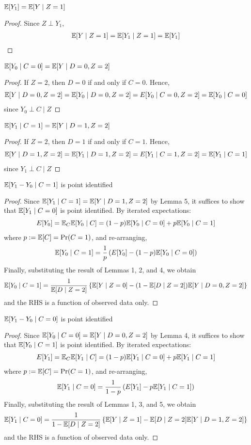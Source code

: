\begin{lem}
$\mathbb{E}[Y_1] = \mathbb{E}[Y\;|\;Z=1]$
\end{lem}
\begin{proof}
Since $Z\perp Y_1$, 
\begin{align*}
\mathbb{E}[Y\;|\;Z=1] =\mathbb{E}[Y_1\;|\;Z=1] = \mathbb{E}[Y_1]
\end{align*}
\end{proof}


\begin{lem}
$\mathbb{E}[Y_0\;|\;C=0] = \mathbb{E}[Y\;|\; D=0,Z=2]$
\end{lem}
\begin{proof}
If $Z=2$, then $D=0$ if and only if $C=0$. Hence,
\[\mathbb{E}[Y\;|\;D=0, Z=2] = \mathbb{E}[Y_0\;|\;D=0, Z=2] = E[Y_0\;|\;C=0, Z=2]=\mathbb{E}[Y_0\;|\;C=0]\]
since $Y_0\perp C\;|\;Z$
\end{proof}

\begin{lem}
$\mathbb{E}[Y_1\;|\;C=1] = \mathbb{E}[Y\;|\; D=1,Z=2]$
\end{lem}
\begin{proof}
If $Z=2$, then $D=1$ if and only if $C=1$. Hence,
\[\mathbb{E}[Y\;|\;D=1, Z=2] = \mathbb{E}[Y_1\;|\;D=1, Z=2] = E[Y_1\;|\;C=1, Z=2]=\mathbb{E}[Y_1\;|\;C=1]\]
since $Y_1\perp C\;|\;Z$
\end{proof}

\begin{theorem} $\mathbb{E}[Y_1-Y_0\;|\; C=1]$ is point identified
\end{theorem}

\begin{proof}
Since $\mathbb{E}[Y_1\;|\; C=1] = \mathbb{E}[Y\;|\; D=1, Z=2]$ by Lemma 5, it suffices to show that $\mathbb{E}[Y_1\;|\;C=0]$ is point identified. By iterated expectations:
\[E[Y_0] = \mathbb{E}_C\mathbb{E}[Y_0\;|\;C] = (1-p)\mathbb{E}[Y_0\;|\;C=0]+p\mathbb{E}[Y_0\;|\;C=1]\]
where $p:=\mathbb{E}[C]=\Pr(C=1)$, and re-arranging,
\[\mathbb{E}[Y_0\;|\;C=1] = \frac{1}{p}\left(E[Y_0] -(1-p)\mathbb{E}[Y_0\;|\;C=0]\right)\]
Finally, substituting the result of Lemmas 1, 2, and 4, we obtain
\[\mathbb{E}[Y_0\;|\;C=1] =\frac{1}{\mathbb{E}[D\;|\;Z=2]}\left\{\mathbb{E}[Y\;|\;Z=0]-(1-\mathbb{E}[D\;|\;Z=2])\mathbb{E}[Y\;|\;D=0, Z=2]\right\}\]
and the RHS is a function of observed data only.
\end{proof}

\begin{theorem} $\mathbb{E}[Y_1-Y_0\;|\; C=0]$ is point identified
\end{theorem}

\begin{proof}
Since $\mathbb{E}[Y_0\;|\; C=0] = \mathbb{E}[Y\;|\; D=0, Z=2]$ by Lemma 4, it suffices to show that $\mathbb{E}[Y_0\;|\;C=1]$ is point identified. By iterated expectations:
\[E[Y_1] = \mathbb{E}_C\mathbb{E}[Y_1\;|\;C] = (1-p)\mathbb{E}[Y_1\;|\;C=0]+p\mathbb{E}[Y_1\;|\;C=1]\]
where $p:=\mathbb{E}[C]=\Pr(C=1)$, and re-arranging,
\[\mathbb{E}[Y_1\;|\;C=0] = \frac{1}{1-p}\left(E[Y_1] -p\mathbb{E}[Y_1\;|\;C=1]\right)\]
Finally, substituting the result of Lemmas 1, 3, and 5, we obtain
\[\mathbb{E}[Y_1\;|\;C=0] =\frac{1}{1-\mathbb{E}[D\;|\;Z=2]}\left\{\mathbb{E}[Y\;|\;Z=1]-\mathbb{E}[D\;|\;Z=2]\mathbb{E}[Y\;|\;D=1, Z=2]\right\}\]
and the RHS is a function of observed data only.
\end{proof}


